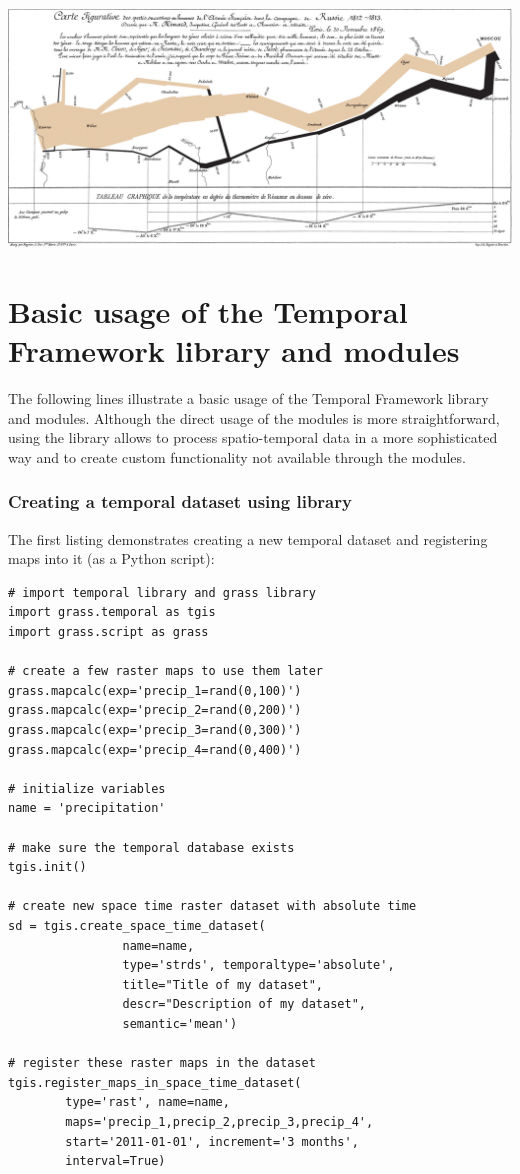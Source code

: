 \documentclass[a4paper,12pt,oneside]{book}
\newcommand{\tf}{Temporal Framework\xspace}
\begin{document}
\begin{center}
  \includegraphics[width=\textheight,angle=90]{./images/Minard.png}
\end{center}


\chapter{Basic usage of the \tf library and modules}
\label{appdx:tfUsage}
The following lines illustrate a basic usage of the \tf library and modules.
Although the direct usage of the modules is more straightforward, using the library
allows to process spatio-temporal data in a more sophisticated way and to create
custom functionality not available through the modules.

\subsection*{Creating a temporal dataset using library}
The first listing demonstrates creating a new temporal dataset
and registering maps into it (as a Python script):

\begin{small}
\begin{lstlisting}[style=python]
# import temporal library and grass library
import grass.temporal as tgis
import grass.script as grass

# create a few raster maps to use them later
grass.mapcalc(exp='precip_1=rand(0,100)')
grass.mapcalc(exp='precip_2=rand(0,200)')
grass.mapcalc(exp='precip_3=rand(0,300)')
grass.mapcalc(exp='precip_4=rand(0,400)')

# initialize variables
name = 'precipitation'

# make sure the temporal database exists
tgis.init()

# create new space time raster dataset with absolute time
sd = tgis.create_space_time_dataset(
                name=name,
                type='strds', temporaltype='absolute',
                title="Title of my dataset",
                descr="Description of my dataset",
                semantic='mean')

# register these raster maps in the dataset
tgis.register_maps_in_space_time_dataset(
        type='rast', name=name,
        maps='precip_1,precip_2,precip_3,precip_4',
        start='2011-01-01', increment='3 months',
        interval=True)

\end{lstlisting}
\end{small}
\end{document}
